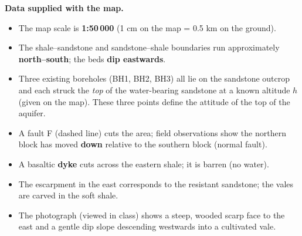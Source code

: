 \documentclass[11pt]{article}
\newcounter{popsec}
\newcounter{popsub}
\newcommand{\courssub}[1]{%
  \stepcounter{popsub}%
  \par\vspace{9pt}\noindent{\popxbold\fontsize{11.5}{13}\selectfont\color{popink}{\color{poporange}\thepopsec.\thepopsub}\hspace{6pt}#1}\par\nopagebreak\vspace{4pt}
}
\begin{document}
\textbf{Data supplied with the map.}
\begin{itemize}
\item The map scale is \textbf{1:50\,000} (1 cm on the map = 0.5 km on the ground).
\item The shale--sandstone and sandstone--shale boundaries run approximately \textbf{north--south}; the beds \textbf{dip eastwards}.
\item Three existing boreholes (BH1, BH2, BH3) all lie on the sandstone outcrop and each struck the \emph{top} of the water-bearing sandstone at a known altitude $h$ (given on the map). These three points define the attitude of the top of the aquifer.
\item A fault F (dashed line) cuts the area; field observations show the northern block has moved \textbf{down} relative to the southern block (normal fault).
\item A basaltic \textbf{dyke} cuts across the eastern shale; it is barren (no water).
\item The escarpment in the east corresponds to the resistant sandstone; the vales are carved in the soft shale.
\item The photograph (viewed in class) shows a steep, wooded scarp face to the east and a gentle dip slope descending westwards into a cultivated vale.
\end{itemize}

\courssub{Tasks}
\end{document}
